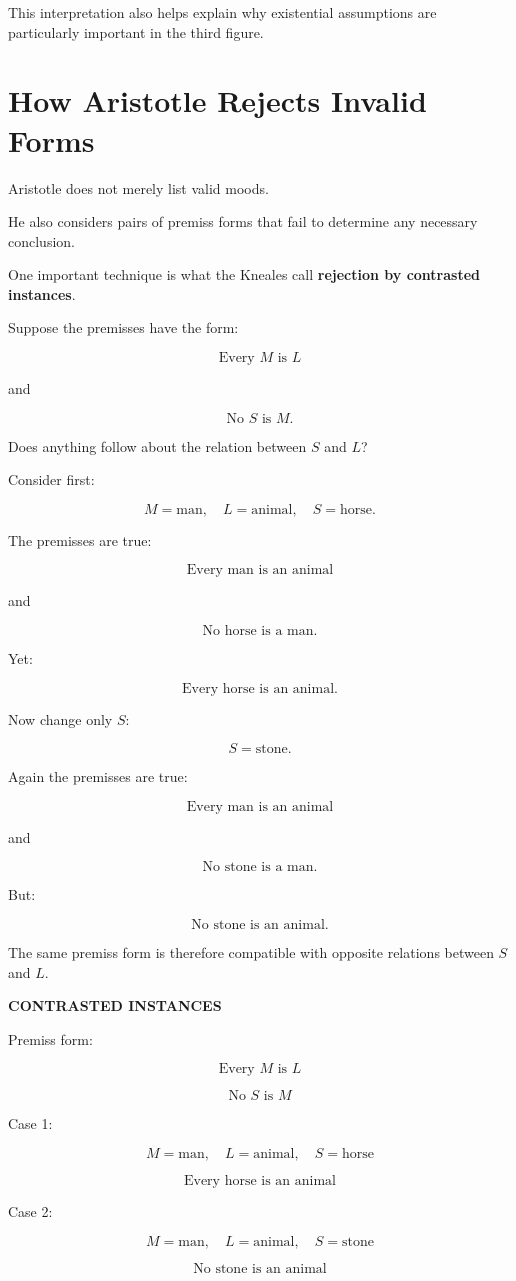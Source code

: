 \documentclass[11pt]{article}
\begin{document}
This interpretation also helps explain why existential assumptions
are particularly important in the third figure.

\section{How Aristotle Rejects Invalid Forms}

Aristotle does not merely list valid moods.

He also considers pairs of premiss forms that fail to determine
any necessary conclusion.

One important technique is what the Kneales call
\textbf{rejection by contrasted instances}.

Suppose the premisses have the form:

\[
\text{Every }M\text{ is }L
\]

and

\[
\text{No }S\text{ is }M.
\]

Does anything follow about the relation between \(S\) and \(L\)?

Consider first:

\[
M=\text{man},
\quad
L=\text{animal},
\quad
S=\text{horse}.
\]

The premisses are true:

\[
\text{Every man is an animal}
\]

and

\[
\text{No horse is a man}.
\]

Yet:

\[
\text{Every horse is an animal}.
\]

Now change only \(S\):

\[
S=\text{stone}.
\]

Again the premisses are true:

\[
\text{Every man is an animal}
\]

and

\[
\text{No stone is a man}.
\]

But:

\[
\text{No stone is an animal}.
\]

The same premiss form is therefore compatible with opposite
relations between \(S\) and \(L\).

\begin{whiteboard}
\textbf{CONTRASTED INSTANCES}

Premiss form:

\[
\text{Every }M\text{ is }L
\]

\[
\text{No }S\text{ is }M
\]

Case 1:

\[
M=\text{man},\quad L=\text{animal},\quad S=\text{horse}
\]

\[
\text{Every horse is an animal}
\]

Case 2:

\[
M=\text{man},\quad L=\text{animal},\quad S=\text{stone}
\]

\[
\text{No stone is an animal}
\]
\end{whiteboard}
\end{document}
